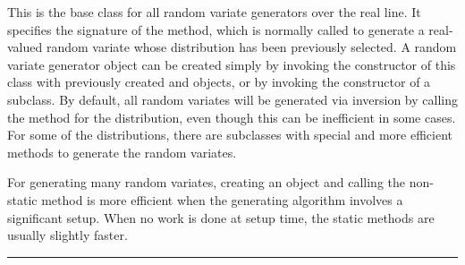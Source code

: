 
This is the base class for all random variate generators over the real line.
It specifies the signature of the  method, which is
normally called to generate a real-valued random variate whose distribution
has been previously selected.
A random variate generator object can be created simply by invoking the
constructor of this class with previously created
 and
objects, or by invoking the constructor of a subclass.
By default, all random variates will be generated via
inversion by calling the
method for the distribution, even though this can be inefficient in some cases.
For some of the distributions, there are subclasses with special and
more efficient methods to generate the random variates.


For generating many random variates, creating an object and calling
the non-static method is more efficient when the generating algorithm
involves a significant setup.
When no work is done at setup time, the static methods are usually
slightly faster.


\bigskip\hrule

